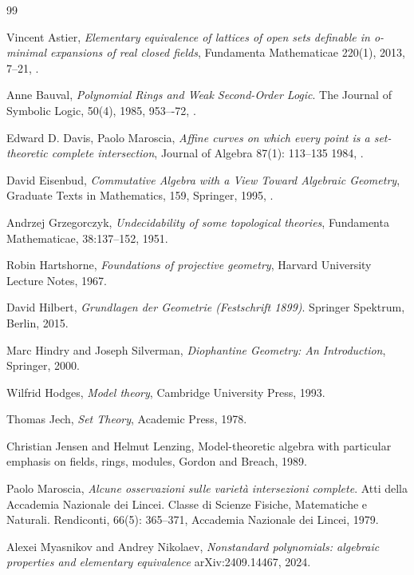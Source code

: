 \documentclass{amsart}
\theoremstyle{plain}
\theoremstyle{definition}
\begin{document}
	\begin{thebibliography}{99}
		
	Vincent Astier, \emph{Elementary equivalence of lattices of open sets definable in o-minimal expansions of real closed fields}, Fundamenta Mathematicae 220(1), 2013, 7--21, .	
		
	Anne Bauval, \emph{Polynomial Rings and Weak Second-Order Logic}. The Journal of Symbolic Logic, 50(4), 1985, 953–-72, .
		
	Edward D. Davis, Paolo Maroscia,
	\emph{Affine curves on which every point is a set-theoretic complete intersection},
	Journal of Algebra 87(1): 113--135
	1984, .
	
	David Eisenbud, \emph{Commutative Algebra with a View Toward Algebraic Geometry}, Graduate Texts in Mathematics, 159, Springer, 1995, .
	
	Andrzej Grzegorczyk, \emph{Undecidability of some topological theories}, Fundamenta Mathematicae, 38:137–152, 1951.
	
	Robin Hartshorne, \emph{Foundations of projective geometry}, Harvard University Lecture Notes, 1967.
	
	David Hilbert, \emph{Grundlagen der Geometrie (Festschrift 1899)}. Springer Spektrum, Berlin, 2015.
	
	Marc Hindry and Joseph Silverman, \emph{Diophantine Geometry: An Introduction}, Springer, 2000.
	
	 Wilfrid Hodges,
	 \emph{Model theory}, Cambridge University Press, 1993.
	
Thomas Jech, \emph{Set Theory}, Academic Press, 1978.

Christian Jensen and Helmut Lenzing, {Model-theoretic algebra with particular emphasis on fields, rings, modules}, Gordon and Breach, 1989.
	
	Paolo Maroscia, \emph{Alcune osservazioni sulle varietà intersezioni complete}. Atti della Accademia Nazionale dei Lincei. Classe di Scienze Fisiche, Matematiche e Naturali. Rendiconti, 66(5): 365--371, Accademia Nazionale dei Lincei, 1979.
	
Alexei Myasnikov and Andrey Nikolaev, \emph{Nonstandard polynomials: algebraic properties and elementary equivalence} arXiv:2409.14467, 2024.	
	

\end{thebibliography}
\end{document}
